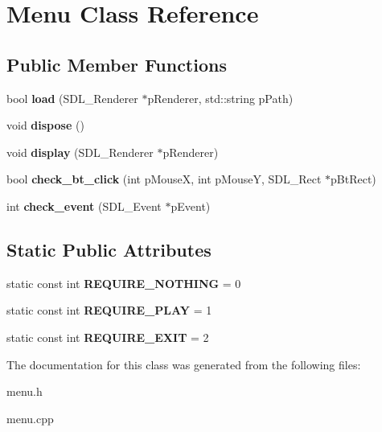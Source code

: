 \hypertarget{classMenu}{}\section{Menu Class Reference}
\label{classMenu}
\subsection*{Public Member Functions}
\begin{DoxyCompactItemize}
\item 
\mbox{\label{classMenu_ac19ec74c53816eb21c6b2b4b08a80ae6}} 
bool {\bfseries load} (S\+D\+L\+\_\+\+Renderer $\ast$p\+Renderer, std\+::string p\+Path)
\item 
\mbox{\label{classMenu_a9812a2ff12ba2d6893a7999732b409ec}} 
void {\bfseries dispose} ()
\item 
\mbox{\label{classMenu_a33f73b67d79cb3ce6054528e4399c057}} 
void {\bfseries display} (S\+D\+L\+\_\+\+Renderer $\ast$p\+Renderer)
\item 
\mbox{\label{classMenu_a5ca95a3d1243ae11a832c5fb09a1c8c8}} 
bool {\bfseries check\+\_\+bt\+\_\+click} (int p\+MouseX, int p\+MouseY, S\+D\+L\+\_\+\+Rect $\ast$p\+Bt\+Rect)
\item 
\mbox{\label{classMenu_a23144139ee503392f4ecb3165f4c0b8c}} 
int {\bfseries check\+\_\+event} (S\+D\+L\+\_\+\+Event $\ast$p\+Event)
\end{DoxyCompactItemize}
\subsection*{Static Public Attributes}
\begin{DoxyCompactItemize}
\item 
\mbox{\label{classMenu_a66180379ab79990d1530543797877ae4}} 
static const int {\bfseries R\+E\+Q\+U\+I\+R\+E\+\_\+\+N\+O\+T\+H\+I\+NG} = 0
\item 
\mbox{\label{classMenu_aa79a2d7e62a35c13adaf52eaadb648ad}} 
static const int {\bfseries R\+E\+Q\+U\+I\+R\+E\+\_\+\+P\+L\+AY} = 1
\item 
\mbox{\label{classMenu_ad29142af4551b9307a5586c5dd120db9}} 
static const int {\bfseries R\+E\+Q\+U\+I\+R\+E\+\_\+\+E\+X\+IT} = 2
\end{DoxyCompactItemize}


The documentation for this class was generated from the following files\+:\begin{DoxyCompactItemize}
\item 
menu.\+h\item 
menu.\+cpp\end{DoxyCompactItemize}
